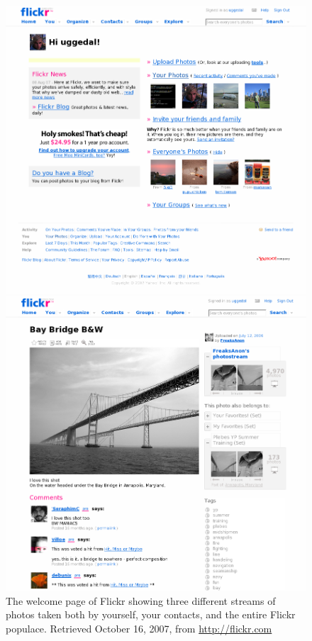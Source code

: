 \begin{figure}
  \captionstyle{\raggedright}
  \begin{whole}
    \begin{minipage}[t]{0.475\wholewidth}
      \includegraphics[width=\textwidth]{scrsh_flickr_welcome}
      \caption[Flickr Welcome Page]{%
         The welcome page of Flickr showing three different streams
         of photos taken both by yourself, your contacts, and the entire
         Flickr populace.
         Retrieved October 16, 2007, from \url{http://flickr.com}}
      \label{figure:scrsh.flickr.welcome}
    \end{minipage}
    \hfill
    \begin{minipage}[t]{0.475\wholewidth}
      \includegraphics[width=\textwidth]{scrsh_flickr_photo_detail}

\end{minipage}
\end{whole}
\end{figure}
